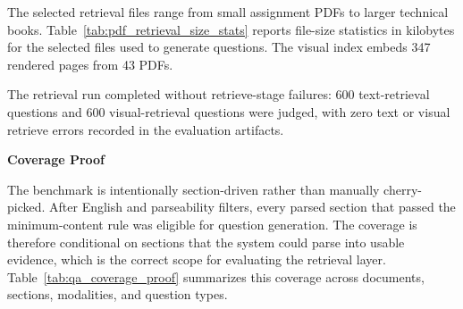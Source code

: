 The selected retrieval files range from small assignment PDFs to larger technical books. Table~\ref{tab:pdf_retrieval_size_stats} reports file-size statistics in kilobytes for the selected files used to generate questions. The visual index embeds 347 rendered pages from 43 PDFs.

\begin{table}[H]
    \centering
    \caption{Selected PDF Retrieval File Size Statistics}
    \label{tab:pdf_retrieval_size_stats}
\end{table}

\begin{table}[H]
    \centering
    \caption{Retrieval Corpus Source Distribution}
    \label{tab:retrieval_source_distribution}
\end{table}

The retrieval run completed without retrieve-stage failures: 600 text-retrieval questions and 600 visual-retrieval questions were judged, with zero text or visual retrieve errors recorded in the evaluation artifacts.

\textbf{Coverage Proof}

The benchmark is intentionally section-driven rather than manually cherry-picked. After English and parseability filters, every parsed section that passed the minimum-content rule was eligible for question generation. The coverage is therefore conditional on sections that the system could parse into usable evidence, which is the correct scope for evaluating the retrieval layer. Table~\ref{tab:qa_coverage_proof} summarizes this coverage across documents, sections, modalities, and question types.

